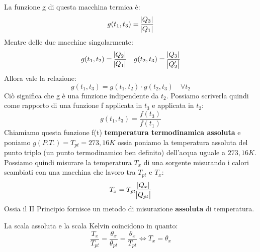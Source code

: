 \documentclass{article}
\newcommand{\note}{\noindent {\quad \bf \underline{Osservazione:}} \quad}
\begin{document}
La funzione g di questa macchina termica è:
\[g(t_1,t_3)=\frac{\abs{Q_3}}{\abs{Q_1}}\]
Mentre delle due macchine singolarmente:
\[g(t_1,t_2)=\frac{\abs{Q_2}}{\abs{Q_1}}\quad g(t_2,t_3)=\frac{\abs{Q_3}}{\abs{Q_2'}}\]
Allora vale la relazione:
\[g(t_1,t_3)=g(t_1,t_2)\cdot g(t_2,t_3)\quad\forall t_2\]
Ciò significa che g è una funzione indipendente da $t_2$. Possiamo scriverla quindi come rapporto di una funzione f applicata in $t_3$ e applicata in $t_2$:
\[g(t_1,t_3)=\frac{f(t_3)}{f(t_1)}\]
Chiamiamo questa funzione f(t) \textbf{temperatura termodinamica assoluta} e poniamo $g(P.T.)=T_{pt}=273,16K$ ossia poniamo la temperatura assoluta del punto triplo (un punto termodinamico ben definito) dell'acqua uguale a $273,16K$. Possiamo quindi misurare la temperatura $T_x$ di una sorgente misurando i calori scambiati con una macchina che lavoro tra $T_{pt}$ e $T_x$:
\[T_x=T_{pt}\frac{\abs{Q_x}}{\abs{Q_{pt}}}\]
Ossia il II Principio fornisce un metodo di misurazione \textbf{assoluta} di temperatura.

\note La scala assoluta e la scala Kelvin coincidono in quanto:
\[\frac{T_x}{T_{pt}}=\frac{\theta_x}{\theta_{pt}}=\frac{\theta_x}{T_{pt}}\iff T_x=\theta_x\]
\end{document}
